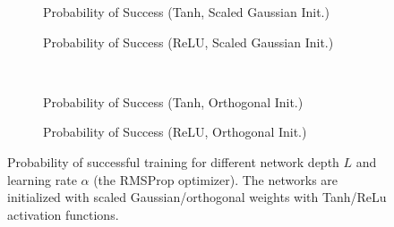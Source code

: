 \begin{figure}[h]
\centering
\newcommand{\myWidth}{0.28\textwidth}
\newcommand{\myspace}{\hspace{3mm}}
\begin{subfigure}{\myWidth}
  \centering
  \caption{Probability of Success (Tanh, Scaled Gaussian Init.)}
  \label{fig:mnist_rmsprop_s1}
\end{subfigure}\myspace%
\begin{subfigure}{\myWidth}
  \centering
  \caption{Probability of Success (ReLU, Scaled Gaussian Init.)}
  \label{fig:mnist_rmsprop_s2}
\end{subfigure}\myspace
\begin{subfigure}{8mm}
\end{subfigure}%
\\
\begin{subfigure}{\myWidth}
  \centering
  \caption{Probability of Success (Tanh, Orthogonal Init.)}
  \label{fig:mnist_rmsprop_s3}
\end{subfigure}\myspace
\begin{subfigure}{\myWidth}
  \centering
  \caption{Probability of Success (ReLU, Orthogonal Init.)}
  \label{fig:mnist_rmsprop_s4}
\end{subfigure}\myspace
\begin{subfigure}{8mm}
\end{subfigure}%
\caption{Probability of successful training for different network depth $L$ and learning rate $\alpha$ (the RMSProp optimizer).  The networks are initialized with scaled Gaussian/orthogonal weights with Tanh/ReLu activation functions.
}
\label{fig:mnist_rmsprop}
\end{figure}